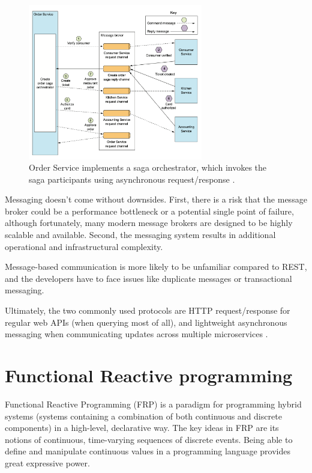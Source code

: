 \documentclass[conference]{IEEEtran}
\begin{document}
\begin{figure}[!htbp]
\centering
\includegraphics[width=3in]{jpeg/orchestrator-saga}
\caption{Order Service implements a saga orchestrator, which invokes the saga participants using asynchronous request/response \cite{microservices-patterns-saga}.}
\label{orchestrator_saga}
\end{figure}

Messaging doesn't come without downsides. First, there is a risk that the message broker could be a performance bottleneck or a potential single point of failure, although fortunately, many modern message brokers are designed to be highly scalable and available.
Second, the messaging system results in additional operational and infrastructural complexity. 

Message-based communication is more likely to be unfamiliar compared to REST, and the developers have to face issues like duplicate messages or transactional messaging.

Ultimately, the two commonly used protocols are HTTP request/response for regular web APIs  (when querying most of all), and lightweight asynchronous messaging when communicating updates across multiple microservices \cite{communication}.

\section{Functional Reactive programming}

Functional Reactive Programming (FRP) \cite{frp} is a paradigm for programming hybrid systems (systems containing a combination of both continuous and discrete components) in a high-level, declarative way. The key ideas in FRP are its notions of continuous, time-varying sequences of discrete events. Being able to define and manipulate continuous values in a programming language provides great expressive power.
\end{document}
